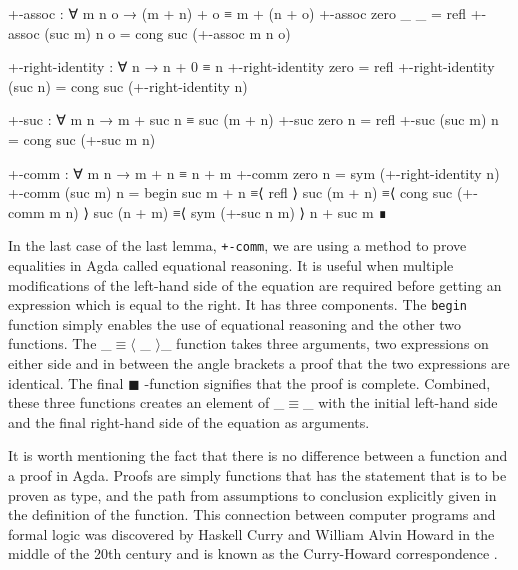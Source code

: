 \documentclass[11pt,a4paper]{article}
\begin{document}
\begin{code}
+-assoc : ∀ m n o → (m + n) + o ≡ m + (n + o)
+-assoc zero    _ _ = refl
+-assoc (suc m) n o = cong suc (+-assoc m n o)

+-right-identity : ∀ n → n + 0 ≡ n
+-right-identity zero = refl
+-right-identity (suc n) = cong suc (+-right-identity n)

+-suc : ∀ m n → m + suc n ≡ suc (m + n)
+-suc zero    n = refl
+-suc (suc m) n = cong suc (+-suc m n)

+-comm : ∀ m n → m + n ≡ n + m
+-comm zero    n = sym (+-right-identity n)
+-comm (suc m) n =
  begin
    suc m + n
  ≡⟨ refl ⟩
    suc (m + n)
  ≡⟨ cong suc (+-comm m n) ⟩
    suc (n + m)
  ≡⟨ sym (+-suc n m) ⟩
    n + suc m
  ∎
\end{code}
In the last case of the last lemma, \texttt{+-comm}, we are using a method to prove equalities in Agda called equational reasoning. It is useful when multiple modifications of the left-hand side of the equation are required before getting an expression which is equal to the right. It has three components. The \texttt{begin} function simply enables the use of equational reasoning and the other two functions. The \_$\equiv\langle$ \_ $\rangle$\_ function takes three arguments, two expressions on either side and in between the angle brackets a proof that the two expressions are identical. The final $\blacksquare$ -function signifies that the proof is complete. Combined, these three functions creates an element of  \_$\equiv$\_ with the initial left-hand side and the final right-hand side of the equation as arguments.

It is worth mentioning the fact that there is no difference between a function and a proof in Agda. Proofs are simply functions that has the statement that is to be proven as type, and the path from assumptions to conclusion explicitly given in the definition of the function. This connection between computer programs and formal logic was discovered by Haskell Curry and William Alvin Howard in the middle of the 20th century and is known as the Curry-Howard correspondence \cite{curry1980hb}.
\end{document}
